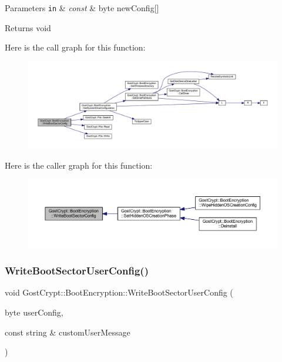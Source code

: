 \begin{DoxyParams}[1]{Parameters}
\mbox{\tt in}  & {\em const} & byte new\+Config\mbox{[}\mbox{]} \\
\hline
\end{DoxyParams}
\begin{DoxyReturn}{Returns}
void 
\end{DoxyReturn}
Here is the call graph for this function\+:
\nopagebreak
\begin{figure}[H]
\begin{center}
\leavevmode
\includegraphics[width=350pt]{class_gost_crypt_1_1_boot_encryption_ac161b91655c0ee99d72b5b7f68ca04a3_cgraph}
\end{center}
\end{figure}
Here is the caller graph for this function\+:
\nopagebreak
\begin{figure}[H]
\begin{center}
\leavevmode
\includegraphics[width=350pt]{class_gost_crypt_1_1_boot_encryption_ac161b91655c0ee99d72b5b7f68ca04a3_icgraph}
\end{center}
\end{figure}
\mbox{\label{class_gost_crypt_1_1_boot_encryption_ac87f57dd76b5e427925623539dd34d7c}} 
\subsubsection{\texorpdfstring{Write\+Boot\+Sector\+User\+Config()}{WriteBootSectorUserConfig()}}
{\footnotesize\ttfamily void Gost\+Crypt\+::\+Boot\+Encryption\+::\+Write\+Boot\+Sector\+User\+Config (\begin{DoxyParamCaption}\item[{byte}]{user\+Config,  }\item[{const string \&}]{custom\+User\+Message }\end{DoxyParamCaption})}



